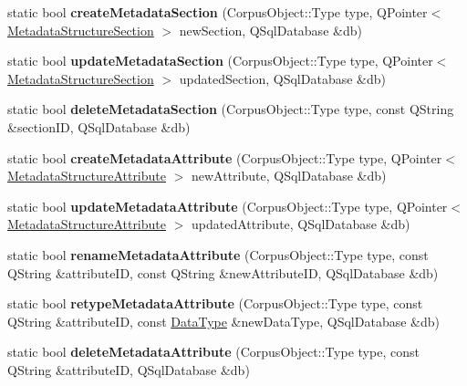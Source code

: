\begin{DoxyCompactItemize}
static bool {\bfseries create\+Metadata\+Section} (Corpus\+Object\+::\+Type type, Q\+Pointer$<$ \hyperlink{class_metadata_structure_section}{Metadata\+Structure\+Section} $>$ new\+Section, Q\+Sql\+Database \&db)
\item 
\mbox{\label{class_s_q_l_serialiser_metadata_structure_a26c74dc82528e0c49a066e5a49577f12}} 
static bool {\bfseries update\+Metadata\+Section} (Corpus\+Object\+::\+Type type, Q\+Pointer$<$ \hyperlink{class_metadata_structure_section}{Metadata\+Structure\+Section} $>$ updated\+Section, Q\+Sql\+Database \&db)
\item 
\mbox{\label{class_s_q_l_serialiser_metadata_structure_a2e7637df05a5c679c3a49fd44df9465d}} 
static bool {\bfseries delete\+Metadata\+Section} (Corpus\+Object\+::\+Type type, const Q\+String \&section\+ID, Q\+Sql\+Database \&db)
\item 
\mbox{\label{class_s_q_l_serialiser_metadata_structure_a296b7f123715718c46a0ffed5d753ff5}} 
static bool {\bfseries create\+Metadata\+Attribute} (Corpus\+Object\+::\+Type type, Q\+Pointer$<$ \hyperlink{class_metadata_structure_attribute}{Metadata\+Structure\+Attribute} $>$ new\+Attribute, Q\+Sql\+Database \&db)
\item 
\mbox{\label{class_s_q_l_serialiser_metadata_structure_a8f2411195859f41fbd089cd81a5f3e19}} 
static bool {\bfseries update\+Metadata\+Attribute} (Corpus\+Object\+::\+Type type, Q\+Pointer$<$ \hyperlink{class_metadata_structure_attribute}{Metadata\+Structure\+Attribute} $>$ updated\+Attribute, Q\+Sql\+Database \&db)
\item 
\mbox{\label{class_s_q_l_serialiser_metadata_structure_ace2c620d0c44bc72e72d0d9bbef3581b}} 
static bool {\bfseries rename\+Metadata\+Attribute} (Corpus\+Object\+::\+Type type, const Q\+String \&attribute\+ID, const Q\+String \&new\+Attribute\+ID, Q\+Sql\+Database \&db)
\item 
\mbox{\label{class_s_q_l_serialiser_metadata_structure_a4e45a95d8e72f44fe923f05ccc194c71}} 
static bool {\bfseries retype\+Metadata\+Attribute} (Corpus\+Object\+::\+Type type, const Q\+String \&attribute\+ID, const \hyperlink{class_data_type}{Data\+Type} \&new\+Data\+Type, Q\+Sql\+Database \&db)
\item 
\mbox{\label{class_s_q_l_serialiser_metadata_structure_a44953904337b027eefa9e93d361cd54e}} 
static bool {\bfseries delete\+Metadata\+Attribute} (Corpus\+Object\+::\+Type type, const Q\+String \&attribute\+ID, Q\+Sql\+Database \&db)
\end{DoxyCompactItemize}
